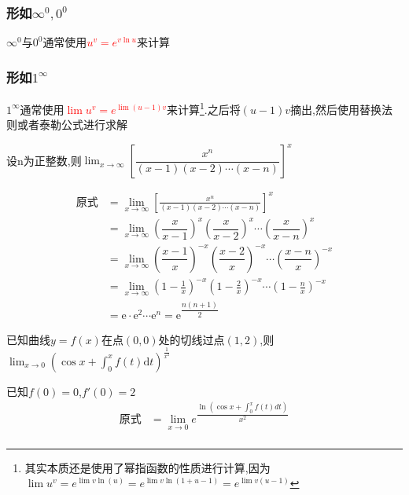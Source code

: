 \documentclass[8pt a4paper, oneside, UTF8]{ctexbook}
\begin{document}
\begin{sloppypar}
    \subsubsection{形如$\infty^0,0^0$}
    $\infty ^0$与$0^0$通常使用\textcolor{red}{$ u^v=e^{v \ln u}$}来计算
    \subsubsection{形如$1^{\infty}$}
    $1 ^ \infty$通常使用\textcolor{red}{$\lim u^v=e^{\lim (u-1)v}$}来计算\footnote{其实本质还是使用了幂指函数的性质进行计算,因为$\lim u^v=e^{\lim v\ln(u)}=e^{\lim v \ln(1 + u -1)}=e^{\lim v (u-1)}$}.之后将$(u-1)v$摘出,然后使用替换法则或者泰勒公式进行求解
    \begin{problem}
    设n为正整数,则$\lim_{x\to\infty}[\dfrac{x^{n}}{\left(x-1\right)\left(x-2\right)\cdots\left(x-n\right)}]^{x}$
    \end{problem}
    \begin{solution}
        \begin{align*}
            \text{原式} & = \lim_{x\to\infty}\left[\frac{x^n}{(x-1)(x-2)\cdots(x-n)}\right]^x                                                             \\
                      & = \lim_{x\to \infty} \left( \dfrac{x}{x-1}\right)^x\left(\dfrac{x}{x-2} \right)^x \cdots \left(\dfrac{x}{x-n}\right)^x          \\
                      & = \lim_{x \to \infty}\left( \dfrac{x-1}{x}\right)^{-x}\left(\dfrac{x-2}{x} \right)^{-x} \cdots \left(\dfrac{x-n}{x}\right)^{-x} \\
                      & = \lim_{x\to\infty}\left(1-\frac{1}{x}\right)^{-x}\left(1-\frac{2}{x}\right)^{-x}\cdots\left(1-\frac{n}{x}\right)^{-x}          \\
                      & = \mathrm{e}\cdot\mathrm{e}^2\cdots\mathrm{e}^n = \mathrm{e}^{\dfrac{n(n+1)}2}
        \end{align*}
    \end{solution}
    \begin{problem}
    已知曲线$y=f(x)$在点$(0,0)$处的切线过点$(1,2)$,则$\lim_{x\to0}\left(\cos x+\int_0^xf(t)\mathrm{d}t\right)^{\frac{1}{x^2}}$
    \end{problem}
    \begin{solution}
        已知$f(0)=0$,$f'(0)=2$
        \begin{align*}
            \text{原式} & = \lim_{x \to 0}e^{\dfrac{\ln\left(\cos x+\int_0^x f(t)dt\right)}{x^2}} \\

\end{align*}
\end{solution}
\end{sloppypar}
\end{document}
